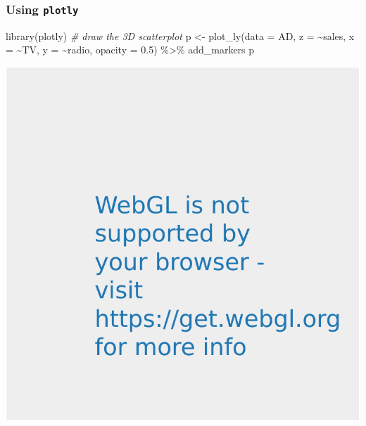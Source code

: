 \documentclass[
]{article}
\newenvironment{Shaded}{\begin{snugshade}}{\end{snugshade}}
\newcommand{\AttributeTok}[1]{\textcolor[rgb]{0.77,0.63,0.00}{#1}}
\newcommand{\CommentTok}[1]{\textcolor[rgb]{0.56,0.35,0.01}{\textit{#1}}}
\newcommand{\FloatTok}[1]{\textcolor[rgb]{0.00,0.00,0.81}{#1}}
\newcommand{\FunctionTok}[1]{\textcolor[rgb]{0.00,0.00,0.00}{#1}}
\newcommand{\NormalTok}[1]{#1}
\newcommand{\OtherTok}[1]{\textcolor[rgb]{0.56,0.35,0.01}{#1}}
\newcommand{\SpecialCharTok}[1]{\textcolor[rgb]{0.00,0.00,0.00}{#1}}
\begin{document}
\hypertarget{using-plotly-1}{%
\subsubsection{\texorpdfstring{Using \texttt{plotly}}{Using plotly}}\label{using-plotly-1}}

\begin{Shaded}
\begin{Highlighting}[]
\FunctionTok{library}\NormalTok{(plotly)}
\CommentTok{\# draw the 3D scatterplot}
\NormalTok{p }\OtherTok{\textless{}{-}} \FunctionTok{plot\_ly}\NormalTok{(}\AttributeTok{data =}\NormalTok{ AD, }\AttributeTok{z =} \SpecialCharTok{\textasciitilde{}}\NormalTok{sales, }\AttributeTok{x =} \SpecialCharTok{\textasciitilde{}}\NormalTok{TV, }\AttributeTok{y =} \SpecialCharTok{\textasciitilde{}}\NormalTok{radio, }\AttributeTok{opacity =} \FloatTok{0.5}\NormalTok{) }\SpecialCharTok{\%\textgreater{}\%} 
\NormalTok{  add\_markers}
\NormalTok{p}
\end{Highlighting}
\end{Shaded}

\begin{center}\includegraphics{SDM-CHAP24_files/figure-latex/unnamed-chunk-2-1} \end{center}
\end{document}
